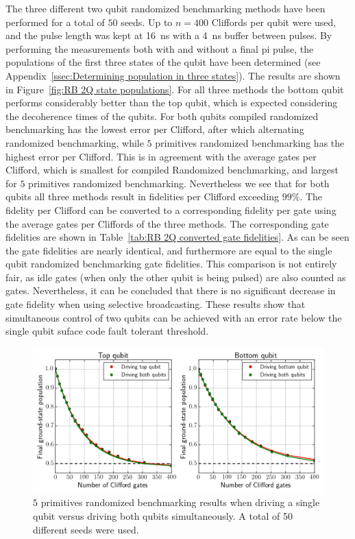           The three different two qubit randomized benchmarking methods have been performed for a total of $50$ seeds. Up to $n=400$ Cliffords per qubit were used, and the pulse length was kept at \SI{16}{\nano \second} with a \SI{4}{\nano \second} buffer between pulses. By performing the measurements both with and without a final pi pulse, the populations of the first three states of the qubit have been determined (see Appendix~\ref{ssec:Determining population in three states}). The results are shown in Figure~\ref{fig:RB 2Q state populations}. For all three methods the bottom qubit performs considerably better than the top qubit, which is expected considering the decoherence times of the qubits. For both qubits compiled randomized benchmarking has the lowest error per Clifford, after which alternating randomized benchmarking, while $5$ primitives randomized benchmarking has the highest error per Clifford. This is in agreement with the average gates per Clifford, which is smallest for compiled Randomized benchmarking, and largest for $5$ primitives randomized benchmarking. Nevertheless we see that for both qubits all three methods result in fidelities per Clifford exceeding $99\%$. The fidelity per Clifford can be converted to a corresponding fidelity per gate using the average gates per Cliffords of the three methods. The corresponding gate fidelities are shown in Table~\ref{tab:RB 2Q converted gate fidelities}. As can be seen the gate fidelities are nearly identical, and furthermore are equal to the single qubit randomized benchmarking gate fidelities. This comparison is not entirely fair, as idle gates (when only the other qubit is being pulsed) are also counted as gates. Nevertheless, it can be concluded that there is no significant decrease in gate fidelity when using selective broadcasting. These results show that simultaneous control of two qubits can be achieved with an error rate below the single qubit suface code fault tolerant threshold.

          \begin{figure}[tb]
            \centering
            \includegraphics[width=\textwidth]{../Figures/Randomized benchmarking/RB_5p_driving_single_both.png}
            \caption{$5$ primitives randomized benchmarking results when driving a single qubit versus driving both qubits simultaneously. A total of 50 different seeds were used.}
            \label{fig:RB 5P single vs both}
          \end{figure}

